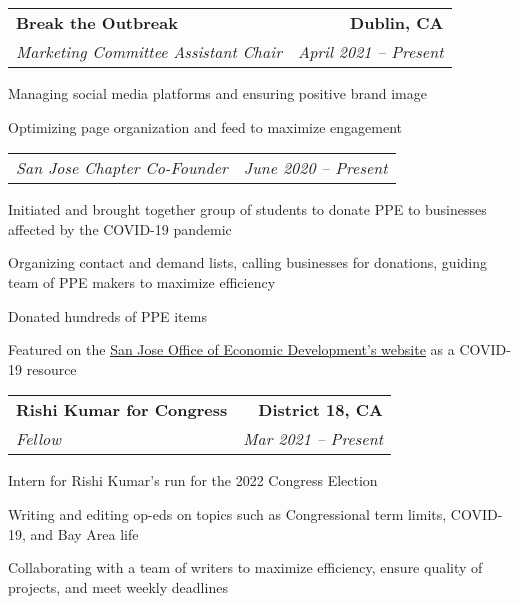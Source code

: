 \documentclass{article}
\newlength{\secskip}
\begin{document}
\goodbreak\vspace{\secskip}\par\noindent\begin{tabularx}{\linewidth}{Xr}
    \textbf{Break the Outbreak} & \textbf{Dublin, CA}\\
    \textit{Marketing Committee Assistant Chair} & \textit{April 2021 -- Present}\\
\end{tabularx}
\begin{compactitem}
    \item Managing social media platforms and ensuring positive brand image
    \item Optimizing page organization and feed to maximize engagement
\end{compactitem}
\goodbreak\vspace{\secskip}\par\noindent\begin{tabularx}{\linewidth}{Xr}
    \textit{San Jose Chapter Co-Founder} & \textit{June 2020 -- Present}\\
\end{tabularx}
\begin{compactitem}
    \item Initiated and brought together group of students to donate PPE to businesses affected by the COVID-19 pandemic
    \item Organizing contact and demand lists, calling businesses for donations, guiding team of PPE makers to maximize efficiency
    \item Donated hundreds of PPE items
    \item Featured on the \href{https://www.sjeconomy.com/why-san-jose/covid-19-guidance/local-suppliers}{\underline{San Jose Office of Economic Development's website}} as a COVID-19 resource
\end{compactitem}

\goodbreak\vspace{\secskip}\par\noindent\begin{tabularx}{\linewidth}{Xr}
    \textbf{Rishi Kumar for Congress} & \textbf{District 18, CA}\\
    \textit{Fellow} & \textit{Mar 2021 -- Present}\\
\end{tabularx}
\begin{compactitem}
    \item Intern for Rishi Kumar's run for the 2022 Congress Election
    \item Writing and editing op-eds on topics such as Congressional term limits, COVID-19, and Bay Area life
    \item Collaborating with a team of writers to maximize efficiency, ensure quality of projects, and meet weekly deadlines
\end{compactitem}
\end{document}
